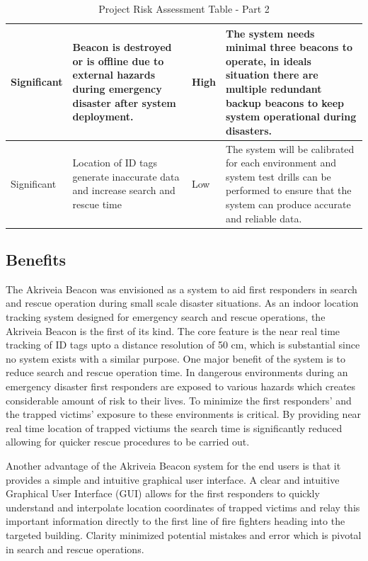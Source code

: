 \begin{table}[H]
\begin{tabular}{ | m{1.6cm} | m{4cm}| m{2cm} | m{7.4cm}|}
\hline
Significant & Beacon is destroyed or is offline due to external hazards during emergency disaster after system deployment. & High & The system needs minimal three beacons to operate, in ideals situation there are multiple redundant backup beacons to keep system operational during disasters. \\
\hline
Significant & Location of ID tags generate inaccurate data and increase  search and rescue time & Low & The system will be calibrated for each environment and system test drills can be performed to ensure that the system can produce accurate and reliable data. \\
\hline
\end{tabular}
\caption{Project Risk Assessment Table - Part 2}
\end{table}	


\pagebreak
\subsection{Benefits}
\medskip
The Akriveia Beacon was envisioned as a system to aid first responders in search and rescue operation during small scale disaster situations. As an indoor location tracking system designed for emergency search and rescue operations, the Akriveia Beacon is the first of its kind. The core feature is the near real time tracking of ID tags upto a distance resolution of 50 cm, which is substantial since no system exists with a similar purpose. One major benefit of the system is to reduce search and rescue operation time. In dangerous environments during an emergency disaster first responders are exposed to various hazards which creates considerable amount of risk to their lives. To minimize the first responders’ and the trapped victims' exposure to these environments is critical. By providing near real time location of trapped victiums the search time is significantly reduced allowing for quicker rescue procedures to be carried out.

\bigskip
Another advantage of the Akriveia Beacon system for the end users is that it provides a simple and intuitive graphical user interface. A clear and intuitive Graphical User Interface (\Gls{GUI}) allows for the first responders to quickly understand and interpolate location coordinates of trapped victims and relay this important information directly to the first line of fire fighters heading into the targeted building. Clarity minimized potential mistakes and error which is pivotal in search and rescue operations.

